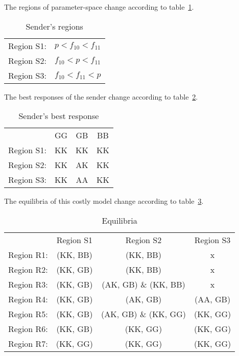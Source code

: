 \documentclass[a4paper,12pt]{article}
\numberwithin{equation}{section}
\begin{document}
The regions of parameter-space change according to table~\ref{tab:Appendix/Cue Game with Conditional Amplification/RegionS}.

\begin{table}[h]
\begin{center}
\begin{tabular}{lc}
Region S1: & $p<f_{10}<f_{11}$\\
Region S2: & $f_{10}<p<f_{11}$\\
Region S3: & $f_{10}<f_{11}<p$
\end{tabular}
\end{center}
\caption{Sender's regions}
\label{tab:Appendix/Cue Game with Conditional Amplification/RegionS}
\end{table}

The best responses of the sender change according to table~\ref{tab:Appendix/Cue Game with Conditional Amplification/BestResponseS}.

\begin{table}[h]
\begin{center}
\begin{tabular}{lccc}
 & GG & GB & BB\\
Region S1: & KK & KK & KK\\
Region S2: & KK & AK & KK\\
Region S3: & KK & AA & KK
\end{tabular}
\end{center}
\caption{Sender's best response}
\label{tab:Appendix/Cue Game with Conditional Amplification/BestResponseS}
\end{table}

\newpage

The equilibria of this costly model change according to table~\ref{tab:Appendix/Cue Game with Conditional Amplification/Equilibria}.

\begin{table}[h]
\begin{center}
\begin{tabular}{lccc}
 & Region S1 & Region S2 & Region S3\\
Region R1: & (KK, BB) & (KK, BB) & x\\
Region R2: & (KK, GB) & (KK, BB) & x\\
Region R3: & (KK, GB) & (AK, GB) \& (KK, BB) & x\\
Region R4: & (KK, GB) & (AK, GB) & (AA, GB)\\
Region R5: & (KK, GB) & (AK, GB) \& (KK, GG) & (KK, GG)\\
Region R6: & (KK, GB) & (KK, GG) & (KK, GG)\\
Region R7: & (KK, GG) & (KK, GG) & (KK, GG)
\end{tabular}
\end{center}
\caption{Equilibria}
\label{tab:Appendix/Cue Game with Conditional Amplification/Equilibria}
\end{table}
\end{document}
